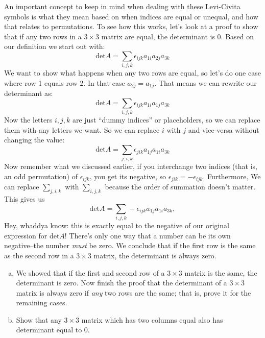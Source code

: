 An important concept to keep in mind when dealing with these Levi-Civita symbols is what they mean based on when indices are equal or unequal, and how that relates to permutations.  To see how this works, let's look at a proof to show that if any two rows in a $3 \times 3$ matrix are equal, the determinant is 0.  Based on our definition we start out with:
\[
\text{det} A = \sum_{i,j,k} \epsilon_{ijk} a_{1i} a_{2j} a_{3k}
\]
We want to show what happens when any two rows are equal, so let's do one case where row 1 equals row 2.  In that case $a_{2j}=a_{1j}$.  That means we can rewrite our determinant as:
\[
\text{det} A =  \sum_{i,j,k} \epsilon_{ijk} a_{1i} a_{1j} a_{3k}
\]
Now the letters $i,j,k$ are just ``dummy indices'' or placeholders, so we can replace them with any letters we want. So we can replace $i$ with $j$ and vice-versa without changing the value:
\[
\text{det} A =  \sum_{j,i,k} \epsilon_{jik} a_{1j} a_{1i} a_{3k}
\]
Now remember what we discussed earlier, if you interchange two indices (that is, an odd permutation) of $\epsilon_{ijk}$, you get its negative, so $\epsilon_{jik}=-\epsilon_{ijk}$.  Furthermore, We can replace $\sum_{j,i,k}$ with $\sum_{i,j,k}$ because the order of summation doesn't matter. This gives us
\[
\text{det} A =  \sum_{i,j,k} -\epsilon_{ijk} a_{1j} a_{1i} a_{3k},
\]
Hey, whaddya know: this is exactly equal to the negative of our original expression for $\text{det} A$!  There's only one way that a number can be its own negative--the number \emph{must} be zero. We conclude that  if the first row is the same as the second row in a $3\times 3$ matrix, the determinant is always zero.

\begin{exercise}{}
\begin{enumerate}[(a)]
\item
We showed that if the first and second row of a $3\times 3$ matrix is the same, the determinant is zero.  Now finish the proof that the determinant of a $3\times 3$ matrix is always zero if \emph{any} two rows are the same; that is, prove it for the remaining cases.
\item
Show that any $3 \times 3$ matrix which has two columns equal also has determinant equal to 0.
\end{enumerate}
\end{exercise}{} 

